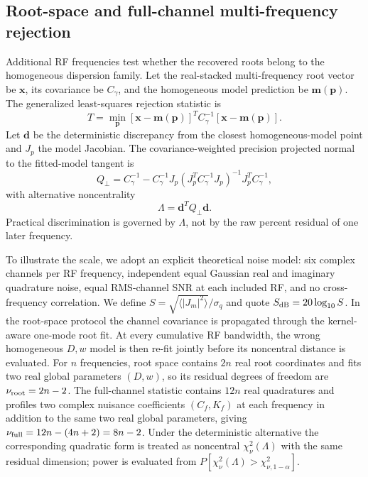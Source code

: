 \documentclass[aps,pra,twocolumn,superscriptaddress,nofootinbib]{revtex4-2}
\begin{document}


\subsection{Root-space and full-channel multi-frequency rejection}

Additional RF frequencies test whether the recovered roots belong to the homogeneous dispersion family. Let the real-stacked multi-frequency root vector be $\bm x$, its covariance be $C_\gamma$, and the homogeneous model prediction be $\bm m(\bm p)$. The generalized least-squares rejection statistic is
\begin{equation}
\boxed{
T=\min_{\bm p}
[\bm x-\bm m(\bm p)]^T
C_\gamma^{-1}
[\bm x-\bm m(\bm p)].
}
\label{eq:teststat}
\end{equation}
Let $\bm d$ be the deterministic discrepancy from the closest homogeneous-model point and $J_p$ the model Jacobian. The covariance-weighted precision projected normal to the fitted-model tangent is
\begin{equation}
Q_\perp=C_\gamma^{-1}
-C_\gamma^{-1}J_p
(J_p^TC_\gamma^{-1}J_p)^{-1}
J_p^TC_\gamma^{-1},
\end{equation}
with alternative noncentrality
\begin{equation}
\boxed{
\Lambda=\bm d^TQ_\perp\bm d.
}
\label{eq:lambda}
\end{equation}
Practical discrimination is governed by $\Lambda$, not by the raw percent residual of one later frequency.

To illustrate the scale, we adopt an explicit theoretical noise model: six complex channels per RF frequency, independent equal Gaussian real and imaginary quadrature noise, equal RMS-channel SNR at each included RF, and no cross-frequency correlation. We define $S=\sqrt{\langle|J_m|^2\rangle}/\sigma_q$ and quote $S_{\rm dB}=20\log_{10}S$. In the root-space protocol the channel covariance is propagated through the kernel-aware one-mode root fit. At every cumulative RF bandwidth, the wrong homogeneous $D,w$ model is then re-fit jointly before its noncentral distance is evaluated. For $n$ frequencies, root space contains $2n$ real root coordinates and fits two real global parameters $(D,w)$, so its residual degrees of freedom are $\nu_{\rm root}=2n-2$. The full-channel statistic contains $12n$ real quadratures and profiles two complex nuisance coefficients $(C_f,K_f)$ at each frequency in addition to the same two real global parameters, giving $\nu_{\rm full}=12n-(4n+2)=8n-2$. Under the deterministic alternative the corresponding quadratic form is treated as noncentral $\chi^2_{\nu}(\Lambda)$ with the same residual dimension; power is evaluated from $P[\chi^2_{\nu}(\Lambda)>\chi^2_{\nu,1-\alpha}]$.
\end{document}
